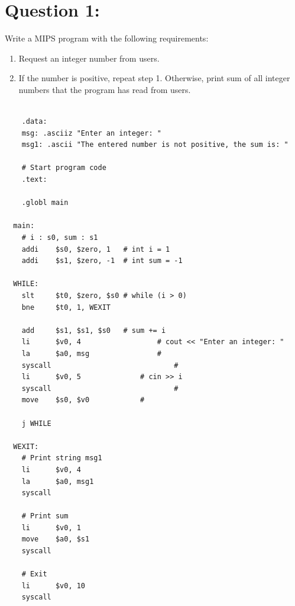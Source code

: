 \documentclass[12pt,a4paper]{article}
\begin{document}
\begin{titlepage}
\begin{center}
\begin{minipage}{0.4\textwidth}
\begin{flushright}
      \end{flushright}
    \end{minipage}

    \vfill

    \vspace{2cm}
    {\large} %
  \end{center}
\end{titlepage}


\section*{Question 1:}
Write a MIPS program with the following requirements:
\begin{enumerate}
  \item Request an integer number from users.
  \item If the number is positive, repeat step 1. Otherwise, print sum of all integer numbers that the program has read from users.
\end{enumerate}

\begin{mdframed}[hidealllines=true,backgroundcolor=magenta!10]
  \begin{lstlisting}

    .data:
    msg: .asciiz "Enter an integer: "
    msg1: .ascii "The entered number is not positive, the sum is: "

    # Start program code
    .text:

    .globl main

  main:
    # i : s0, sum : s1
    addi	$s0, $zero, 1 	# int i = 1
    addi	$s1, $zero, -1 	# int sum = -1

  WHILE:
    slt		$t0, $zero, $s0	# while (i > 0)
    bne		$t0, 1, WEXIT

    add		$s1, $s1, $s0 	# sum += i
    li		$v0, 4					# cout << "Enter an integer: "
    la		$a0, msg				#
    syscall								#
    li		$v0, 5				# cin >> i
    syscall								#
    move	$s0, $v0			#

    j WHILE

  WEXIT:
    # Print string msg1
    li		$v0, 4
    la		$a0, msg1
    syscall

    # Print sum
    li		$v0, 1
    move	$a0, $s1
    syscall

    # Exit
    li		$v0, 10
    syscall

  \end{lstlisting}
\end{mdframed}
\end{document}
